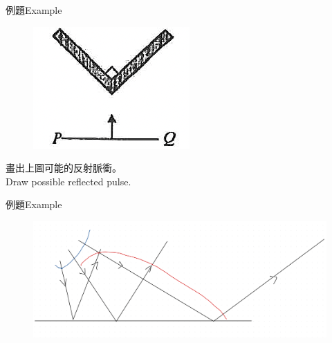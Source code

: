 \documentclass[beamer=true]{standalone}
\begin{document}
\begin{frame}[t]{例題Example}
    \begin{figure}
        \centering
        \includegraphics[width=0.25\linewidth]{images/Screenshot 2023-09-27 at 7.20.47 PM.png}


    \end{figure}
    畫出上圖可能的反射脈衝。\\Draw possible reflected pulse.
\end{frame}

\begin{frame}{例題Example}
    \begin{figure}
        \centering
        \includegraphics[width=1\linewidth]{images/IMG_F76D36A09E8B-1.jpeg}
    \end{figure}
\end{frame}
\end{document}
